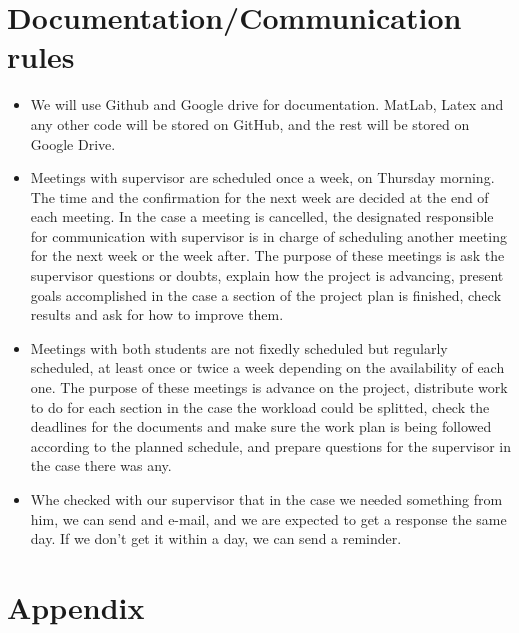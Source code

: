 \documentclass{article}
\begin{document}
	\section{Documentation/Communication rules}
	\begin{itemize}
			\item We will use Github and Google drive for documentation. MatLab, Latex and any other code will be stored on GitHub, and the rest will be stored on Google Drive.
			
			\item Meetings with supervisor are scheduled once a week, on Thursday morning. The time and the confirmation for the next week are decided at the end of each meeting. In the case a meeting is cancelled, the designated responsible for communication with supervisor is in charge of scheduling another meeting for the next week or the week after. The purpose of these meetings is ask the supervisor questions or doubts, explain how the project is advancing, present goals accomplished in the case a section of the project plan is finished, check results and ask for how to improve them.
			
			\item Meetings with both students are not fixedly scheduled but regularly scheduled, at least once or twice a week depending on the availability of each one. The purpose of these meetings is advance on the project, distribute work to do for each section in the case the workload could be splitted, check the deadlines for the documents and make sure the work plan is being followed according to the planned schedule, and prepare questions for the supervisor in the case there was any.
			
			\item Whe checked with our supervisor that in the case we needed something from him, we can send and e-mail, and we are expected to get a response the same day. If we don't get it within a day, we can send a reminder. 
			
	\end{itemize}

	
	\section{Appendix}
	
\end{document}
